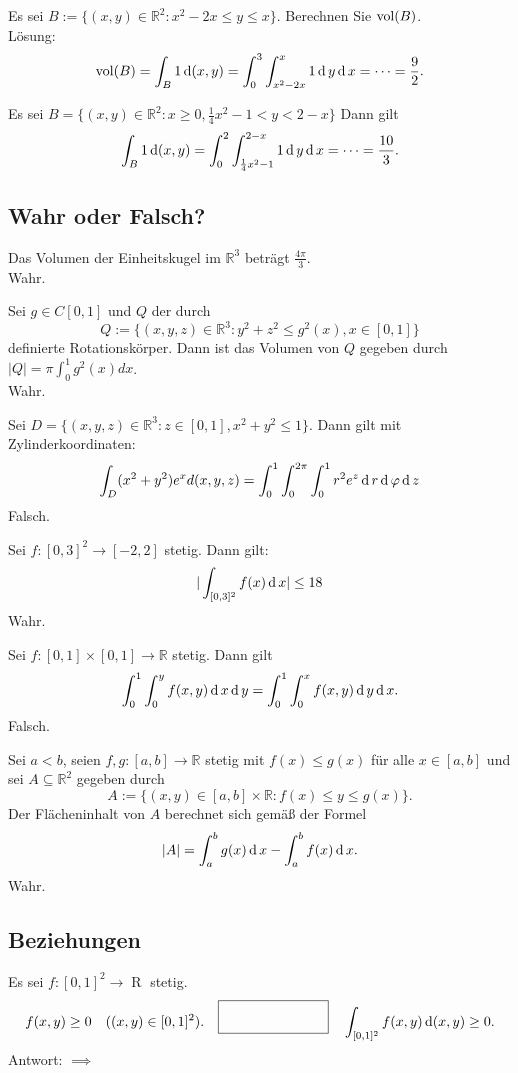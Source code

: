 Es sei $B := \{(x,y) \in \mathbb{R}^2 : x^2 - 2x \leq y \leq x\}$.
Berechnen Sie $\operatorname{vol}(B)$.\\
Lösung:
\begin{displaymath}
  \operatorname{vol}(B) = \int_B 1 \operatorname{\mathop{}\!\mathrm{d}}(x,y) = \int_0^3 \int_{x^2 - 2x}^{x} 1 \operatorname{\mathop{}\!\mathrm{d}} y \operatorname{\mathop{}\!\mathrm{d}} x = \dots = \frac{9}{2}.
\end{displaymath}

Es sei $B = \{(x,y) \in \mathbb{R}^2 : x \geq 0, \frac{1}{4}x^2 - 1 < y < 2 - x\}$
Dann gilt
\begin{displaymath}
  \int_B 1 \operatorname{\mathop{}\!\mathrm{d}}(x,y) = \int_0^2 \int_{\frac{1}{4}x^2 - 1}^{2 - x} 1 \operatorname{\mathop{}\!\mathrm{d}} y \operatorname{\mathop{}\!\mathrm{d}} x = \dots = \frac{10}{3}.
\end{displaymath}

\subsection{Wahr oder Falsch?}
Das Volumen der Einheitskugel im $\mathbb{R}^3$ beträgt $\frac{4\pi}{3}$.\\
Wahr.

Sei $g \in C[0,1]$ und $Q$ der durch
\begin{displaymath}
  Q := \{(x,y,z) \in \mathbb{R}^3 : y^2 + z^2 \leq g^2(x), x \in [0,1]\}
\end{displaymath}
definierte Rotationskörper.
Dann ist das Volumen von $Q$ gegeben durch $|Q| = \pi \int_{0}^{1} g^2(x)dx$.\\
Wahr.

Sei $D = \{(x,y,z) \in \mathbb{R}^3 : z \in [0,1], x^2 + y^2 \leq 1\}$.
Dann gilt mit Zylinderkoordinaten:
\begin{displaymath}
  \int_D (x^2 + y^2)e^x d(x,y,z) = \int_0^1 \int_0^{2\pi} \int_0^1 r^2 e^z \operatorname{\mathop{}\!\mathrm{d}} r \operatorname{\mathop{}\!\mathrm{d}} \varphi \operatorname{\mathop{}\!\mathrm{d}} z
\end{displaymath}
Falsch.

Sei $f : [0,3]^2 \to [-2,2]$ stetig.
Dann gilt:
\begin{displaymath}
  |\int_{[0,3]^2} f(x) \operatorname{\mathop{}\!\mathrm{d}} x | \leq 18
\end{displaymath}
Wahr.

Sei $f : [0,1] \times [0,1] \to \mathbb{R}$ stetig.
Dann gilt
\begin{displaymath}
  \int_0^1 \int_0^y f(x,y) \operatorname{\mathop{}\!\mathrm{d}} x \operatorname{\mathop{}\!\mathrm{d}} y = \int_0^1 \int_0^x f(x,y) \operatorname{\mathop{}\!\mathrm{d}} y \operatorname{\mathop{}\!\mathrm{d}} x.
\end{displaymath}
Falsch.

Sei $a < b$, seien $f,g : [a,b] \to \mathbb{R}$ stetig mit $f(x) \leq g(x)$ für alle $x \in [a,b]$ und sei $A \subseteq \mathbb{R}^2$ gegeben durch
\begin{displaymath}
  A := \{(x,y) \in [a,b] \times \mathbb{R} : f(x) \leq y \leq g(x)\}.
\end{displaymath}
Der Flächeninhalt von $A$ berechnet sich gemäß der Formel
\begin{displaymath}
  |A| = \int_a^b g(x) \operatorname{\mathop{}\!\mathrm{d}} x - \int_a^b f(x) \operatorname{\mathop{}\!\mathrm{d}} x.
\end{displaymath}
Wahr.

\subsection{Beziehungen}
Es sei $f : [0,1]^2 \to \mathop{R}$ stetig.
\begin{displaymath}
  f(x,y) \geq 0 \quad ((x,y) \in [0,1]^2).
  \quad \fbox{\rule{1in}{0pt}\rule[-0.5ex]{0pt}{4ex}} \quad
  \int_{[0,1]^2} f(x,y) \diff (x,y) \geq 0.
\end{displaymath}
Antwort: $\implies$